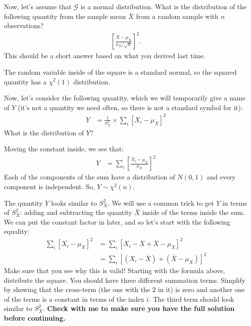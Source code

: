 
Now, let's assume that $\mathcal{G}$ is a normal distribution. What is the
distribution of the following quantity from the sample mean $\bar{X}$ from a
random sample with $n$ observations?
\begin{align*}
\left[\frac{\bar{X} - \mu_X}{\sigma_X / \sqrt{n}} \right]^2.
\end{align*}
This should be a short answer based on what you derived last time.


The random variable inside of the square is a standard normal, so
the squared quantity has a $\chi^2(1)$ distribution.


Now, let's consider the following quantity, which we will temporarily
give a name of $Y$ (it's not a quantity we need often, so there is not
a standard symbol for it):
\begin{align*}
Y &= \frac{1}{\sigma_X^2} \times \sum_i \left[ X_i - \mu_X \right]^2 
\end{align*}
What is the distribution of $Y$?


Moving the constant inside, we see that:
\begin{align*}
Y &=  \sum_i \left[ \frac{X_i - \mu_X}{\sigma_X} \right]^2 
\end{align*}
Each of the components of the sum have a distribution of $N(0, 1)$ and
every component is independent. So, $Y \sim \chi^2(n)$.


The quantity $Y$ looks similar to $S_X^2$. We will use a common trick to
get $Y$ in terms of $S_X^2$: adding and subtracting the quantity $\bar{X}$
inside of the terms inside the sum. We can put the constant factor in later,
and so let's start with the following equality:
\begin{align*}
\sum_i \left[ X_i - \mu_X \right]^2 &= \sum_i \left[ X_i - \bar{X} + \bar{X} - \mu_X \right]^2  \\
&= \sum_i \left[ (X_i - \bar{X}) + (\bar{X} - \mu_X) \right]^2 
\end{align*}
Make sure that you see why this is valid! Starting with the
formula above, distribute the square. You should have three different summation
terms. Simplify by showing that the cross-term (the one with the $2$ in it) is
zero and another one of the terms is a constant in terms of the index $i$. The
third term should look similar to $S_X^2$. \textbf{Check with me to make sure
you have the full solution before continuing.}

